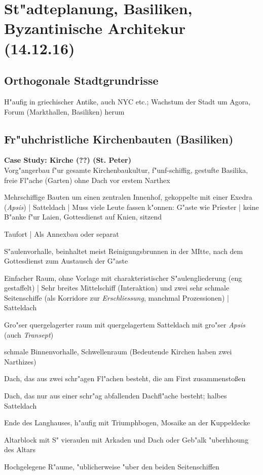 \documentclass[emulatestandardclasses]{scrartcl}
\begin{document}
\section{St"adteplanung, Basiliken, Byzantinische Architekur\\(14.12.16)}

\subsection{Orthogonale Stadtgrundrisse}

H"aufig in griechischer Antike, auch NYC etc.; Wachstum der Stadt um Agora, Forum (Markthallen, Basiliken) herum


\subsection{Fr"uhchristliche Kirchenbauten (Basiliken)}

\noindent\textbf{Case Study: Kirche (??) (St. Peter)}\\
Vorg"angerbau f"ur gesamte Kirchenbaukultur, f"unf-schiffig, gestufte Basilika, freie Fl"ache (Garten) ohne Dach vor erstem Narthex


\begin{description}[leftmargin=!,labelwidth=\widthof{\bfseries Baptisterium}]
  \item[Basilika] Mehrschiffige Bauten um einen zentralen Innenhof, gekoppelte mit einer Exedra (\emph{Apsis}) | Satteldach | Muss viele Leute fassen k"onnen: G"aste wie Priester | keine B"anke f"ur Laien, Gottesdienst auf Knien, sitzend 
  \item[Baptisterium] Taufort | Als Annexbau oder separat
  \item[Atrium] S"aulenvorhalle, beinhaltet meist Reinigungsbrunnen in der MItte, nach dem Gottesdienst zum Austausch der G"aste
  \item[Langhaus] Einfacher Raum, ohne Vorlage mit charakteristischer S"aulengliederung (eng gestaffelt) | Sehr breites Mittelschiff (Interaktion) und zwei sehr schmale Seitenschiffe (als Korridore zur \emph{Erschliessung}, manchmal Prozessionen) | Satteldach
  \item[Querhaus] Gro"ser quergelagerter raum mit quergelagertem Satteldach mit gro"ser \emph{Apsis} (auch \emph{Transept})
  \item[Narthex] schmale Binnenvorhalle, Schwellenraum (Bedeutende Kirchen haben zwei Narthizes)
  \item[Satteldach] Dach, das aus zwei schr"agen Fl"achen besteht, die am First zusammenstoßen
  \item[Pultdach] Dach, das nur aus einer schr"ag abfallenden Dachfl"ache besteht; halbes Satteldach
  \item[Apsis] Ende des Langhauses, h"aufig mit Triumphbogen, Mosaike an der Kuppeldecke
  \item[Ziborium] Altarblock mit S" vieraulen mit Arkaden und Dach oder Geb"alk "uberhhoung des Altars
  \item[Empore] Hochgelegene R"aume, "ublicherweise "uber den beiden Seitenschiffen
\end{description}
\end{document}
